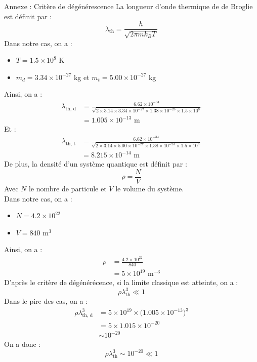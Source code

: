 \documentclass{beamer}
\begin{document}
\begin{frame}{Annexe : Critère de dégénérescence}
    La longueur d'onde thermique de de Broglie est définit par :
    \[ \boxed{\lambda_\text{th} = \frac{h}{\sqrt{2\pi mk_BT}}} \]
    Dans notre cas, on a :
    \begin{itemize}
        \item $T = 1.5\times10^8$ K \\
        \item $m_d = 3.34\times10^{-27}$ kg et $m_t = 5.00\times10^{-27}$ kg
    \end{itemize}
    Ainsi, on a :
    \begin{align*}
        \lambda_\text{th, d} &= \frac{6.62\times10^{-34}}{\sqrt{2\times3.14\times3.34\times10^{-27}\times1.38\times10^{-23}\times1.5\times10^8}} \\
        &= 1.005\times10^{-13}\text{ m}
    \end{align*}
    Et :
    \begin{align*}
        \lambda_\text{th, t} &= \frac{6.62\times10^{-34}}{\sqrt{2\times3.14\times5.00\times10^{-27}\times1.38\times10^{-23}\times1.5\times10^8}} \\
        &= 8.215\times10^{-14}\text{ m}
    \end{align*}
    De plus, la densité d'un système quantique est définit par :
    \[ \boxed{\rho = \frac{N}{V}} \]
    Avec $N$ le nombre de particule et $V$ le volume du système. \\
    Dans notre cas, on a :
    \begin{itemize}
        \item $N = 4.2\times10^{22}$
        \item $V = 840$ m$^3$
    \end{itemize}
    Ainsi, on a :
    \begin{align*}
        \rho &= \frac{4.2\times10^{22}}{840} \\
        &= 5\times10^{19}\text{ m}^{-3}
    \end{align*}
    D'après le critère de dégénérécence, si la limite classique est atteinte, on a :
    \[ \rho\lambda_\text{th}^3\ll1 \]
    Dans le pire des cas, on a :
    \begin{align*}
        \rho\lambda_\text{th, d}^3 &= 5\times10^{19}\times\Big(1.005\times10^{-13}\Big)^3 \\
        &= 5\times1.015\times10^{-20} \\
        &\sim10^{-20}
    \end{align*}
    On a donc :
    \[ \rho\lambda_\text{th}^3\sim10^{-20}\ll1 \]
\end{frame}
\end{document}
